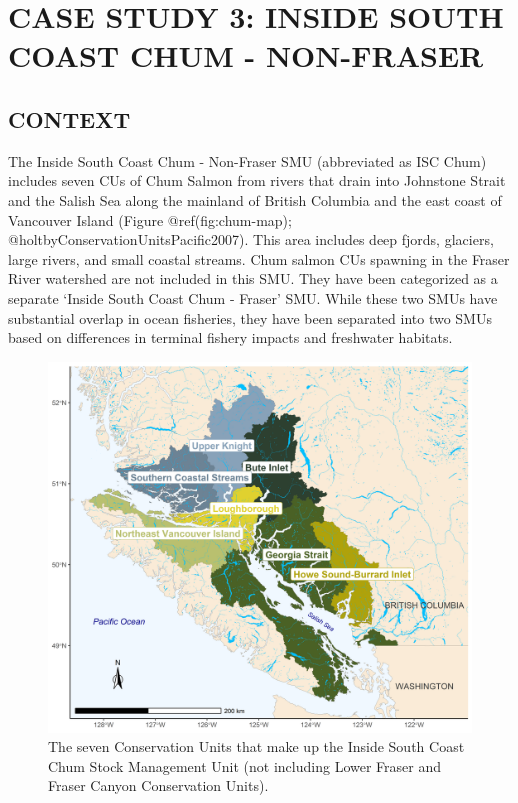 \documentclass[
]{article}
\author{}
\date{\vspace{-2.5em}}
\begin{document}
\newpage

\hypertarget{ISCchumChapter}{%
\section{CASE STUDY 3: INSIDE SOUTH COAST CHUM -
NON-FRASER}\label{ISCchumChapter}}

\hypertarget{chum-context}{%
\subsection{CONTEXT}\label{chum-context}}

The Inside South Coast Chum - Non-Fraser SMU (abbreviated as ISC Chum)
includes seven CUs of Chum Salmon from rivers that drain into Johnstone
Strait and the Salish Sea along the mainland of British Columbia and the
east coast of Vancouver Island (Figure @ref(fig:chum-map);
@holtbyConservationUnitsPacific2007). This area includes deep fjords,
glaciers, large rivers, and small coastal streams. Chum salmon CUs
spawning in the Fraser River watershed are not included in this SMU.
They have been categorized as a separate `Inside South Coast Chum -
Fraser' SMU. While these two SMUs have substantial overlap in ocean
fisheries, they have been separated into two SMUs based on differences
in terminal fishery impacts and freshwater habitats.

\begin{figure}

{\centering \includegraphics[width=66.67in]{figure/chum-map} 

}

\caption{The seven Conservation Units that make up the Inside South Coast Chum Stock Management Unit (not including Lower Fraser and Fraser Canyon Conservation Units).}\label{fig:chum-map}
\end{figure}
\linebreak
\end{document}
